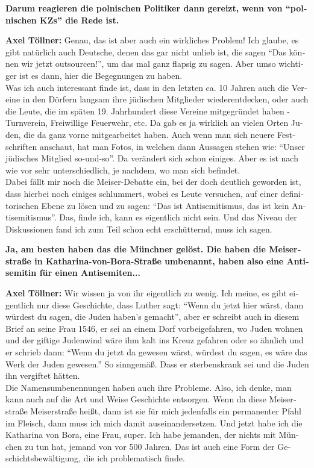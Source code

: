 \begin{otherlanguage}{ngerman}
\textbf{Darum reagieren die polnischen Politiker dann gereizt, wenn von "`polnischen KZs"' die Rede ist.} 

\textbf{Axel Töllner:} Genau, das ist aber auch ein wirkliches Problem! Ich glaube, es gibt natürlich auch Deutsche, denen das gar nicht unlieb ist, die sagen "`Das können wir jetzt outsourcen!"', um das mal ganz flapsig zu sagen. Aber umso wichtiger ist es dann, hier die Begegnungen zu haben.\\
Was ich auch interessant finde ist, dass in den letzten ca. 10 Jahren auch die Vereine in den Dörfern langsam ihre jüdischen Mitglieder wiederentdecken, oder auch die Leute, die im späten 19. Jahrhundert diese Vereine mitgegründet haben - Turnverein, Freiwillige Feuerwehr, etc. Da gab es ja wirklich an vielen Orten Juden, die da ganz vorne mitgearbeitet haben. Auch wenn man sich neuere Festschriften anschaut, hat man Fotos, in welchen dann Aussagen stehen wie: "`Unser jüdisches Mitglied so-und-so"'. Da verändert sich schon einiges. Aber es ist nach wie vor sehr unterschiedlich, je nachdem, wo man sich befindet.\\
Dabei fällt mir noch die Meiser-Debatte ein, bei der doch deutlich geworden ist, dass hierbei noch einiges schlummert, wobei es Leute versuchen, auf einer definitorischen Ebene zu lösen und zu sagen: "`Das ist Antisemitismus, das ist kein Antisemitismus"'. Das, finde ich, kann es eigentlich nicht sein. Und das Niveau der Diskussionen fand ich zum Teil schon echt erschütternd, muss ich sagen. 

\textbf{Ja, am besten haben das die Münchner gelöst. Die haben die Meiserstraße in Katharina-von-Bora-Straße umbenannt, haben also eine Antisemitin für einen Antisemiten...} 

\textbf{Axel Töllner:} Wir wissen ja von ihr eigentlich zu wenig. Ich meine, es gibt eigentlich nur diese Geschichte, dass Luther sagt: "`Wenn du jetzt hier wärst, dann würdest du sagen, die Juden haben's gemacht"', aber er schreibt auch in diesem Brief an seine Frau 1546, er sei an einem Dorf vorbeigefahren, wo Juden wohnen und der giftige Judenwind wäre ihm kalt ins Kreuz gefahren oder so ähnlich und er schrieb dann: "`Wenn du jetzt da gewesen wärst, würdest du sagen, es wäre das Werk der Juden gewesen."' So sinngemäß. Dass er sterbenskrank sei und die Juden ihn vergiftet hätten.\\
Die Namensumbenennungen haben auch ihre Probleme. Also, ich denke, man kann auch auf die Art und Weise Geschichte entsorgen. Wenn da diese Meiserstraße Meiserstraße heißt, dann ist sie für mich jedenfalls ein permanenter Pfahl im Fleisch, dann muss ich mich damit auseinandersetzen. Und jetzt habe ich die Katharina von Bora, eine Frau, super. Ich habe jemanden, der nichts mit München zu tun hat, jemand von vor 500 Jahren. Das ist auch eine Form der Geschichtsbewältigung, die ich problematisch finde. 


\end{otherlanguage}
